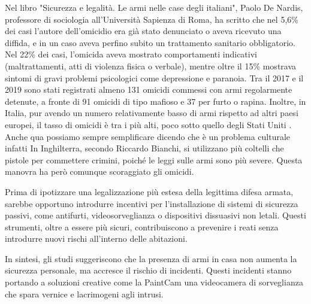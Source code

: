 \documentclass[12pt]{book} %
\begin{document}
\begin{mdframed}[linewidth=1pt]
Nel libro "Sicurezza e legalità. Le armi nelle case degli italiani", Paolo De Nardis, professore di sociologia all'Università Sapienza di Roma, ha scritto che nel 5,6\% dei casi l’autore dell’omicidio era già stato denunciato o aveva ricevuto una diffida, e in un caso aveva perfino subito un trattamento sanitario obbligatorio. Nel 22\% dei casi, l’omicida aveva mostrato comportamenti indicativi (maltrattamenti, atti di violenza fisica o verbale), mentre oltre il 15\% mostrava sintomi di gravi problemi psicologici come depressione e paranoia. Tra il 2017 e il 2019 sono stati registrati almeno 131 omicidi commessi con armi regolarmente detenute, a fronte di 91 omicidi di tipo mafioso e 37 per furto o rapina. Inoltre, in Italia, pur avendo un numero relativamente basso di armi rispetto ad altri paesi europei, il tasso di omicidi è tra i più alti, poco sotto quello degli Stati Uniti .
Anche qua possiamo sempre semplificare dicendo che è un problema culturale infatti In Inghilterra, secondo Riccardo Bianchi, si utilizzano più coltelli che pistole per commettere crimini, poiché le leggi sulle armi sono più severe. Questa manovra ha però comunque scoraggiato gli omicidi.

Prima di ipotizzare una legalizzazione più estesa della legittima difesa armata, sarebbe opportuno introdurre incentivi per l'installazione di sistemi di sicurezza passivi, come antifurti, videosorveglianza o dispositivi dissuasivi non letali. Questi strumenti, oltre a essere più sicuri, contribuiscono a prevenire i reati senza introdurre nuovi rischi all'interno delle abitazioni.

In sintesi, gli studi suggeriscono che la presenza di armi in casa non aumenta la sicurezza personale, ma accresce il rischio di incidenti. Questi incidenti stanno portando a soluzioni creative come la PaintCam una videocamera di sorveglianza che spara vernice e lacrimogeni agli intrusi.
\end{mdframed}

\bigskip
\end{document}
